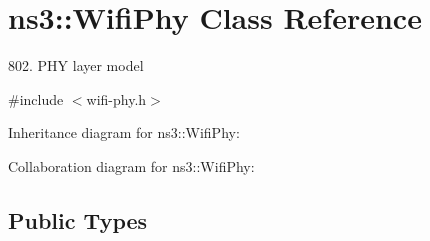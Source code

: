 \hypertarget{classns3_1_1WifiPhy}{}\section{ns3\+:\+:Wifi\+Phy Class Reference}
\label{classns3_1_1WifiPhy}


802. P\+HY layer model  




{\ttfamily \#include $<$wifi-\/phy.\+h$>$}



Inheritance diagram for ns3\+:\+:Wifi\+Phy\+:


Collaboration diagram for ns3\+:\+:Wifi\+Phy\+:
\subsection*{Public Types}
